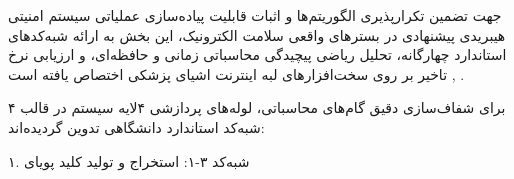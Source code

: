 



جهت تضمین تکرارپذیری  الگوریتم‌ها و اثبات قابلیت پیاده‌سازی عملیاتی سیستم امنیتی هیبریدی پیشنهادی در بسترهای واقعی سلامت الکترونیک، این بخش به ارائه شبه‌کدهای استاندارد چهارگانه، تحلیل ریاضی پیچیدگی محاسباتی زمانی و حافظه‌ای، و ارزیابی نرخ تاخیر  بر روی سخت‌افزارهای لبه اینترنت اشیای پزشکی  اختصاص یافته است , .\par




برای شفاف‌سازی دقیق گام‌های محاسباتی، لوله‌های پردازشی ۴لایه سیستم در قالب ۴ شبه‌کد استاندارد دانشگاهی تدوین گردیده‌اند:\par



۱. شبه‌کد ۳{-}۱: استخراج  و تولید کلید پویای \par



